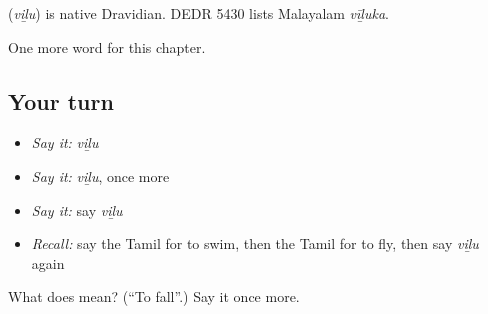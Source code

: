 \begin{cousinweb}
\textbf{} (\emph{viḻu}) is native Dravidian. DEDR 5430 lists Malayalam \emph{vīḻuka}.
\end{cousinweb}

\begin{grammarlens}[title={What you've built}]
One more word for this chapter.
\end{grammarlens}

\subsection*{Your turn}
\begin{itemize}
\raggedright
  \item \emph{Say it:} \emph{viḻu}
  \item \emph{Say it:} \emph{viḻu}, once more
  \item \emph{Say it:} say \emph{viḻu}
  \item \emph{Recall:} say the Tamil for to swim, then the Tamil for to fly, then say \emph{viḻu} again
\end{itemize}

\begin{tcolorbox}[breakable,colback=teal!4,colframe=teal!35!black,title={Before you move on}]
What does  mean? (\textquotedblleft{}To fall\textquotedblright{}.) Say it once more.
\end{tcolorbox}
